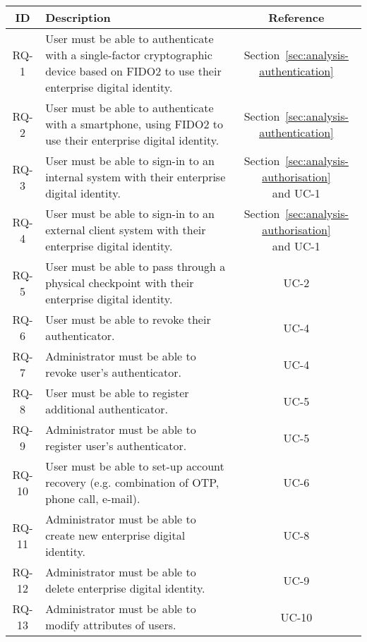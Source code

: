 \begin{table}[htbp!]
    \footnotesize
    \onehalfspacing
    \centering
    \begin{tabular}{|c|p{15cm}|c|}
    \hline
    \cellcolor[HTML]{CBCEFB}\textbf{ID}&\cellcolor[HTML]{CBCEFB}\textbf{Description}&\cellcolor[HTML]{CBCEFB}\textbf{Reference}\\
    \hline
    RQ-1&User must be able to authenticate with a single-factor cryptographic device based on FIDO2 to use their enterprise digital identity.&Section~\ref{sec:analysis-authentication}\\
    \hline
    RQ-2&User must be able to authenticate with a smartphone, using FIDO2 to use their enterprise digital identity.&Section~\ref{sec:analysis-authentication}\\
    \hline
    \hline
    RQ-3&User must be able to sign-in to an internal system with their enterprise digital identity.&\makecell{Section~\ref{sec:analysis-authorisation}\\and UC-1}\\
    \hline
    RQ-4&User must be able to sign-in to an external client system with their enterprise digital identity.&\makecell{Section~\ref{sec:analysis-authorisation}\\ and UC-1}\\
    \hline
    \hline
    RQ-5&User must be able to pass through a physical checkpoint with their enterprise digital identity.&UC-2\\
    \hline
    \hline
    RQ-6&User must be able to revoke their authenticator.&UC-4\\
    \hline
    RQ-7&Administrator must be able to revoke user’s authenticator.&UC-4\\
    \hline
    \hline
    RQ-8&User must be able to register additional authenticator.&UC-5\\
    \hline
    RQ-9&Administrator must be able to register user’s authenticator.&UC-5\\
    \hline
    \hline
    RQ-10&User must be able to set-up account recovery (e.g. combination of OTP, phone call, e-mail).&UC-6\\
    \hline
    \hline
    RQ-11&Administrator must be able to create new enterprise digital identity.&UC-8\\
    \hline
    \hline
    RQ-12&Administrator must be able to delete enterprise digital identity.&UC-9\\
    \hline
    \hline
    RQ-13&Administrator must be able to modify attributes of users.&UC-10\\

\end{tabular}
\end{table}
